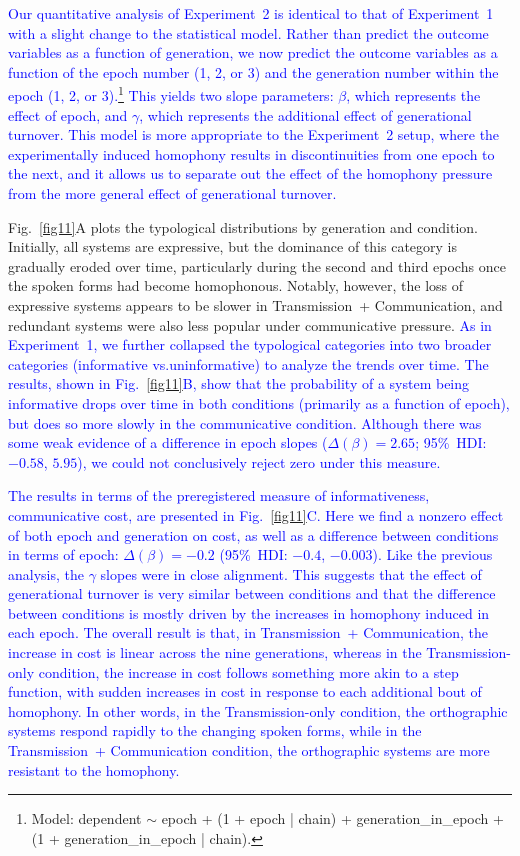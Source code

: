 \documentclass[doc,biblatex]{apa7}
\newcommand\newmaterial[1]{\textcolor{blue}{#1}}
\begin{document}
\newmaterial{Our quantitative analysis of Experiment~2 is identical to that of Experiment~1 with a slight change to the statistical model. Rather than predict the outcome variables as a function of generation, we now predict the outcome variables as a function of the epoch number (1, 2, or 3) and the generation number within the epoch (1, 2, or 3).\footnote{Model: dependent $\sim$ epoch + (1 + epoch | chain) + generation\_in\_epoch + (1 + generation\_in\_epoch | chain).} This yields two slope parameters: $\beta$, which represents the effect of epoch, and $\gamma$, which represents the additional effect of generational turnover. This model is more appropriate to the Experiment~2 setup, where the experimentally induced homophony results in discontinuities from one epoch to the next, and it allows us to separate out the effect of the homophony pressure from the more general effect of generational turnover.}

Fig.~\ref{fig11}A plots the typological distributions by generation and condition. Initially, all systems are expressive, but the dominance of this category is gradually eroded over time, particularly during the second and third epochs once the spoken forms had become homophonous. Notably, however, the loss of expressive systems appears to be slower in Transmission~+ Communication, and redundant systems were also less popular under communicative pressure. \newmaterial{As in Experiment~1, we further collapsed the typological categories into two broader categories (informative vs.\@ uninformative) to analyze the trends over time. The results, shown in Fig.~\ref{fig11}B, show that the probability of a system being informative drops over time in both conditions (primarily as a function of epoch), but does so more slowly in the communicative condition. Although there was some weak evidence of a difference in epoch slopes ($\Delta(\beta) = 2.65$; 95\%~HDI: $-0.58$, $5.95$), we could not conclusively reject zero under this measure.}

\newmaterial{The results in terms of the preregistered measure of informativeness, communicative cost, are presented in Fig.~\ref{fig11}C. Here we find a nonzero effect of both epoch and generation on cost, as well as a difference between conditions in terms of epoch: $\Delta(\beta) = -0.2$ (95\%~HDI: $-0.4$, $-0.003$). Like the previous analysis, the $\gamma$ slopes were in close alignment. This suggests that the effect of generational turnover is very similar between conditions and that the difference between conditions is mostly driven by the increases in homophony induced in each epoch. The overall result is that, in Transmission~+ Communication, the increase in cost is linear across the nine generations, whereas in the Transmission-only condition, the increase in cost follows something more akin to a step function, with sudden increases in cost in response to each additional bout of homophony. In other words, in the Transmission-only condition, the orthographic systems respond rapidly to the changing spoken forms, while in the Transmission~+ Communication condition, the orthographic systems are more resistant to the homophony.}
\end{document}

